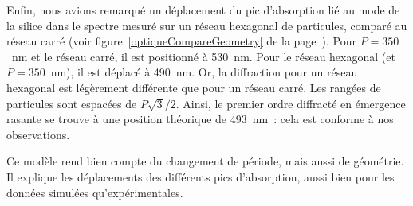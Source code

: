 Enfin, nous avions remarqué un déplacement du pic d'absorption lié au mode de la silice dans le spectre mesuré sur un réseau hexagonal de particules, comparé au réseau carré (voir figure~\ref{optiqueCompareGeometry} de la page~\pageref{optiqueCompareGeometry}). Pour $P = 350$~nm et le réseau carré, il est positionné à 530~nm. Pour le réseau hexagonal (et $P=350$~nm), il est déplacé à 490~nm. Or, la diffraction pour un réseau hexagonal est légèrement différente que pour un réseau carré. Les rangées de particules sont espacées de $P\sqrt{3}/2$. Ainsi, le premier ordre diffracté en émergence rasante se trouve à une position théorique de 493~nm~: cela est conforme à nos observations.\par 

Ce modèle rend bien compte du changement de période, mais aussi de géométrie. Il explique les déplacements des différents pics d'absorption, aussi bien pour les données simulées qu'expérimentales.\par 


